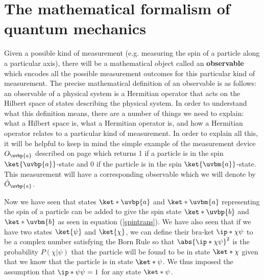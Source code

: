 \section{The mathematical formalism of quantum mechanics}
Given a possible kind of measurement (e.g. measuring the spin of a particle along a particular axis), there will be a mathematical object called an \textbf{observable} which encodes all the possible measurement outcomes for this particular kind of measurement. The precise mathematical definition of an observable is as follows: an observable of a physical system is a Hermitian operator that acts on the Hilbert space of states describing the physical system. In order to understand what this definition means, there are a number of things we need to explain: what a Hilbert space is, what a Hermitian operator is, and how a Hermitian operator relates to a particular kind of measurement. In order to explain all this, it will be helpful to keep in mind the simple example of the measurement device $O_{\uvbp{a}}$ described on page \pageref{Lambdaa} which returns 1 if a particle is in the spin $\ket{\uvbp{a}}$-state and 0 if the particle is in the spin $\ket{\uvbm{a}}$-state. This measurement will have a corresponding observable which we will denote by $\hat{O}_{\uvbp{a}}$. 

Now we have seen that states $\ket*{\uvbp{a}}$ and $\ket*{\uvbm{a}}$ representing the spin of  a particle can be added to give the spin state $\ket*{\uvbp{b}}$ and $\ket*{\uvbm{b}}$ as seen in equation (\ref{spintrans}). We have also seen that if we have two states $\ket{\psi}$ and $\ket{\chi}$, we can define their bra-ket $\ip*{\chi}{\psi}$ to be a complex number satisfying the Born Rule so that $\abs{\ip*{\chi}{\psi}}^2$ is the probability $P(\chi|\psi)$ that the particle will be found to be in state $\ket*{\chi}$ given that we know that the particle is in state $\ket*{\psi}$. We thus imposed the assumption that  $\ip*{\psi}{\psi}=1$ for any state $\ket*{\psi}$. 

